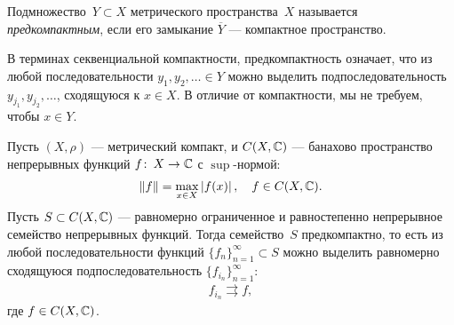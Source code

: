 \documentclass[../complex-analysis.tex]{subfiles}
\begin{document}
\begin{df}
 Подмножество~$ Y \subset X $ метрического пространства~$ X $ называется \emph{предкомпактным}, если его замыкание $ \overline Y $ --- компактное пространство.

 В терминах секвенциальной компактности, предкомпактность означает, что из любой последовательности $ y_1, y_2, \ldots \in Y $ можно выделить подпоследовательность $ y_{j_1}, y_{j_2}, \ldots $, сходящуюся к $ x \in X $. В отличие от компактности, мы не требуем, чтобы $ x \in Y $.
\end{df}

\begin{thm}
 Пусть $ (X,\rho) $ --- метрический компакт, и $ C(X,\mathbb{C}) $ --- банахово пространство непрерывных функций $ f \colon\,X \to \mathbb{C} $ с $ \sup $-нормой:
 \begin{align*}
  \left\| f \right\| = \max_{x \in X} \left| f(x) \right|, \quad f \in C(X,\mathbb{C}).
 \end{align*} Пусть $S \subset C(X,\mathbb{C})$ --- равномерно ограниченное и равностепенно непрерывное семейство непрерывных функций. Тогда семейство~$ S $ предкомпактно, то есть из любой последовательности функций $\{f_{n}\}_{n=1}^{\infty} \subset S$  можно выделить равномерно сходящуюся подпоследовательность $\{f_{i_n}\}_{n=1}^{\infty} $:
 \begin{align*}
  f_{i_n} \rightrightarrows f,
 \end{align*} где $ f \in C(X,\mathbb{C}) $.
\end{thm}
\end{document}
